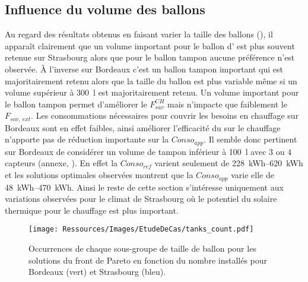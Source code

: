 \subsection{Influence du volume des ballons} %
\label{sub:influence_du_volume_des_ballons}
Au regard des résultats obtenus en faisant varier la taille des ballons
(), il apparaît clairement que un volume important
pour le ballon d’ est plus souvent retenue sur Strasbourg alors que pour le
ballon tampon aucune préférence n’est observée. À l’inverse sur Bordeaux c’est un ballon
tampon important qui est majoritairement retenu alors que la taille du ballon 
est plus variable même si un volume supérieur à \SI{300}{\litre} est majoritairement
retenu. Un volume important pour le ballon tampon permet d’améliorer le $F_{sav}^{CH}$
mais n’impacte que faiblement le $F_{sav,\, ext}$. Les consommations nécessaires pour
couvrir les besoins en chauffage sur Bordeaux sont en effet faibles, ainsi améliorer
l’efficacité du  sur le chauffage n’apporte pas de réduction importante sur la
$Conso_{app}$. Il semble donc pertinent sur Bordeaux de considérer un volume de tampon
inférieur à \SI{100}{\litre} avec $3$ ou $4$ capteurs (annexe, ).
En effet la $Conso_{ref}$ varient seulement de \SIrange{228}{620}{kWh} et les solutions
optimales observées montrent que la $Conso_{app}$ varie elle de \SIrange{48}{470}{kWh}. Ainsi le
reste de cette section s’intéresse uniquement aux variations observées pour le climat de
Strasbourg où le potentiel du solaire thermique pour le chauffage est plus important.

\begin{figure}
    \centering
    \texttt{[image: Ressources/Images/EtudeDeCas/tanks\_count.pdf]}
    \caption[Occurrences de chaque sous-groupe de taille de ballon pour les solutions du front de Pareto]
             {Occurrences de chaque sous-groupe de taille de ballon pour les solutions du front de Pareto
              en fonction du nombre installés pour Bordeaux (vert) et Strasbourg (bleu).}
    \label{fig:occurence_taille_ballons}
\end{figure}


